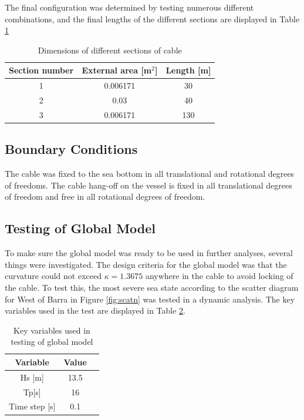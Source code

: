\noindent The final configuration was determined by testing numerous different combinations, and the final lengths of the different sections are displayed in Table \ref{table:DIMCABLE} 
\begin{table} [H]
\centering
\begin{tabular}{ |c|c|c|}
\hline
Section number & External area [m$^2$] & Length [m] \\
 \hline
 \hline
1 & 0.006171 & 30\\
2 & 0.03 & 40\\
3 & 0.006171 & 130\\
 \hline
\end{tabular}
\caption{Dimensions of different sections of cable}
\label{table:DIMCABLE}
\end{table}

\subsection{Boundary Conditions}
The cable was fixed to the sea bottom in all translational and rotational degrees of freedoms. The cable hang-off on the vessel is fixed in all translational degrees of freedom and free in all rotational degrees of freedom. 

\subsection{Testing of Global Model}
To make sure the global model was ready to be used in further analyses, several things were investigated. The design criteria for the global model was that the curvature could not exceed $\kappa=1.3675$ anywhere in the cable to avoid locking of the cable. To test this, the most severe sea state according to the scatter diagram for West of Barra in Figure \ref{fig:scatn} was tested in a dynamic analysis. The key variables used in the test are displayed in Table \ref{table:testglob}.

\begin{table} [H]
\centering
\begin{tabular}{ |c|c|c|}
\hline
Variable & Value \\
 \hline
 \hline
Hs [m] & 13.5\\
Tp[s] & 16 \\
Time step [s] & 0.1 \\
 \hline
\end{tabular}
\caption{Key variables used in testing of global model}
\label{table:testglob}
\end{table}

